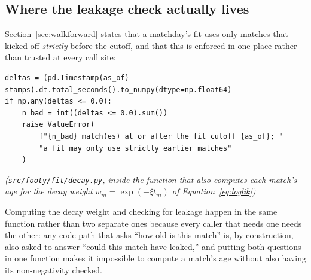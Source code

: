 \documentclass[11pt,a4paper]{article}
\begin{document}
\begin{appendices}
\subsection{Where the leakage check actually lives}

Section~\ref{sec:walkforward} states that a matchday's fit uses only matches
that kicked off \emph{strictly} before the cutoff, and that this is enforced
in one place rather than trusted at every call site:

\begin{lstlisting}
deltas = (pd.Timestamp(as_of) - stamps).dt.total_seconds().to_numpy(dtype=np.float64)
if np.any(deltas <= 0.0):
    n_bad = int((deltas <= 0.0).sum())
    raise ValueError(
        f"{n_bad} match(es) at or after the fit cutoff {as_of}; "
        "a fit may only use strictly earlier matches"
    )
\end{lstlisting}
\emph{(\texttt{src/footy/fit/decay.py}, inside the function that also
computes each match's age for the decay weight $w_m = \exp(-\xi t_m)$ of
Equation~\eqref{eq:loglik})}

Computing the decay weight and checking for leakage happen in the same
function rather than two separate ones because every caller that needs one
needs the other: any code path that asks ``how old is this match'' is, by
construction, also asked to answer ``could this match have leaked,'' and
putting both questions in one function makes it impossible to compute a
match's age without also having its non-negativity checked.

\end{appendices}

\clearpage



\end{document}
